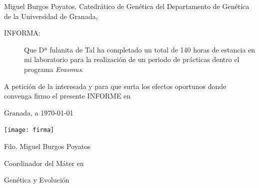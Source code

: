 \documentclass[a4paper,12pt]{article}
\begin{document}
\doublespace

\vspace*{2cm}   
Miguel Burgos Poyatos, Catedrático de Genética del Departamento de Genética de la Universidad de Granada,

\begin{description}
	\item[INFORMA:]Que Dª fulanita de Tal ha completado un total de 140 horas de estancia en mi laboratorio para la realización de un periodo de prácticas dentro el programa \emph{Erasmus}.
\end{description}

A petición de la interesada y para que surta los efectos oportunos donde convenga firmo el presente INFORME en 

Granada, a \today

\begin{center}
\singlespace

\texttt{[image: firma]}

\vspace{-1.2cm}

Fdo. Miguel Burgos Poyatos

Coordinador del Máter en

Genética y Evolución
\end{center}
\end{document}
